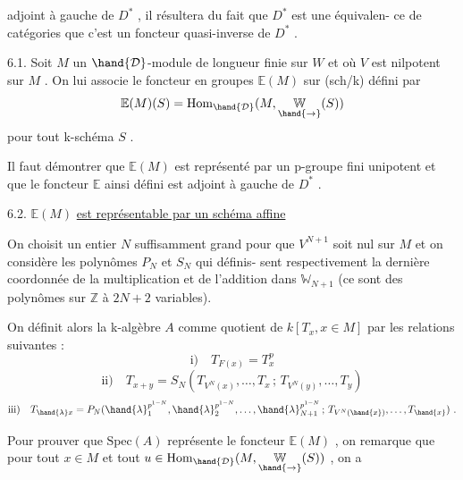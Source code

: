 
adjoint à gauche de $D^*$ , il résultera du fait que $D^*$ est une équivalen-%
ce de catégories que c'est un foncteur quasi-inverse de $D^*$ .

6.1. Soit $M$ un $\hand{\mathcal{D}}$-module de longueur finie sur $W$ et où $V$ est
nilpotent sur $M$ . On lui associe le foncteur en groupes $\mathbb{E}(M)$ sur
(sch/k) défini par
\[ \mathbb{E}(M)(S) = \mathrm{Hom}_{\hand{\mathcal{D}}}(M, \underset{\hand{\to}}{\mathbb{W}}(S)) \]
pour tout k-schéma $S$ .

Il faut démontrer que $\mathbb{E}(M)$ est représenté par un p-groupe
fini unipotent et que le foncteur $\mathbb{E}$ ainsi défini est adjoint à gauche
de $D^*$ .

6.2. $\mathbb{E}(M)$ \uline{est représentable par un schéma affine}

On choisit un entier $N$ suffisamment grand pour que $V^{N+1}$
soit nul sur $M$ et on considère les polynômes $P_N$ et $S_N$ qui définis-%
sent respectivement la dernière coordonnée de la multiplication et de
l'addition dans $\mathbb{W}_{N+1}$ (ce sont des polynômes sur $\mathbb{Z}$ à $2N+2$ variables).

On définit alors la k-algèbre $A$ comme quotient de
$k[T_x, x \in M]$ par les relations suivantes :
\[ \text{i)}\quad T_{F(x)} = T_x^p \]
\[ \text{ii)}\quad T_{x+y} = S_N(T_{V^N(x)}, \ldots, T_x \,;\, T_{V^N(y)}, \ldots, T_y) \]
\margin{$\times$}
\[ \text{iii)}\quad T_{\hand{\lambda}x} = P_N(\hand{\lambda}_1^{p^{1-N}}, \hand{\lambda}_2^{p^{1-N}}, \ldots, \hand{\lambda}_{N+1}^{p^{1-N}} \,;\, T_{V^N(\hand{x})}, \ldots, T_{\hand{x}}) \ . \]

Pour prouver que $\mathrm{Spec}(A)$ représente le foncteur $\mathbb{E}(M)$ ,
on remarque que pour tout $x \in M$ et tout $u \in \mathrm{Hom}_{\hand{\mathcal{D}}}(M, \underset{\hand{\to}}{\mathbb{W}}(S))$ , on a

